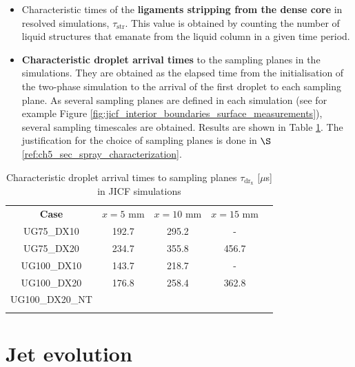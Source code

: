 \begin{itemize}

	\item  Characteristic times of the \textbf{ligaments stripping from the dense core} in resolved simulations, $\tau_\mathrm{str}$. This value is obtained by counting the number of liquid structures that emanate from the liquid column in a given time period.

	
	\item \textbf{Characteristic droplet arrival times} to the sampling planes in the simulations. They are obtained as the elapsed time from the initialisation of the two-phase simulation to the arrival of the first droplet to each sampling plane. As several sampling planes are defined in each simulation (see for example Figure \ref{fig:jicf_interior_boundaries_surface_measurements}), several sampling timescales are obtained. Results are shown in Table \ref{tab:jicf_characteristic_droplet_sampling_times}. The justification for the choice of sampling planes is done in $\S$\ref{ref:ch5_sec_spray_characterization}.


\end{itemize}



\begin{table}[!h]
\centering
\caption{Characteristic droplet arrival times to sampling planes $\tau_\mathrm{dr_x}$ [$\mu$s] in JICF simulations}
\begin{tabular}{ccccc}
\thickhline
\textbf{Case} & $x = 5$ mm & $x = 10$ mm & $x = 15$ mm  \\
\thickhline 
UG75\_DX10  & 192.7 & 295.2 & -  \\
UG75\_DX20  & 234.7 & 355.8 & 456.7 \\
UG100\_DX10 & 143.7 & 218.7 & - \\
UG100\_DX20 & 176.8 & 258.4 & 362.8 \\
UG100\_DX20\_NT &  & & \\
\thickhline
\end{tabular}
\label{tab:jicf_characteristic_droplet_sampling_times}
\end{table}



\section{Jet evolution}


